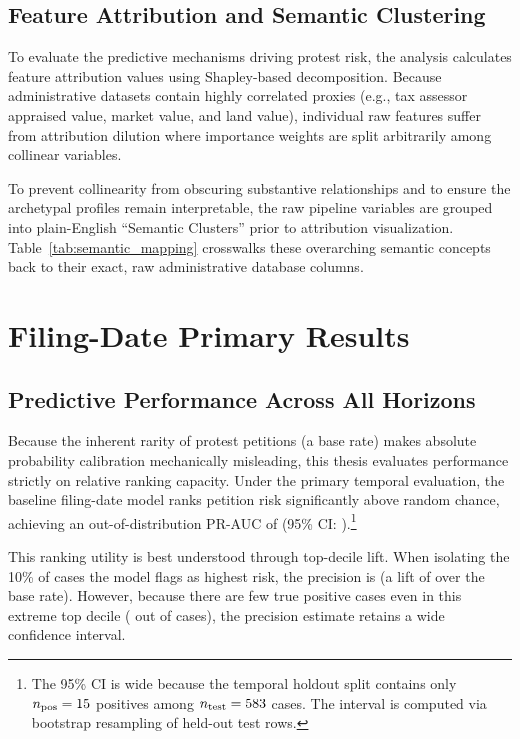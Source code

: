 \documentclass[11pt, letterpaper, oneside]{article}
\begin{document}
\subsection{Feature Attribution and Semantic Clustering}
\label{sec:feature_attribution}

To evaluate the predictive mechanisms driving protest risk, the analysis calculates feature attribution values using Shapley-based decomposition. Because administrative datasets contain highly correlated proxies (e.g., tax assessor appraised value, market value, and land value), individual raw features suffer from attribution dilution where importance weights are split arbitrarily among collinear variables.

To prevent collinearity from obscuring substantive relationships and to ensure the archetypal profiles remain interpretable, the raw pipeline variables are grouped into plain-English ``Semantic Clusters'' prior to attribution visualization. Table~\ref{tab:semantic_mapping} crosswalks these overarching semantic concepts back to their exact, raw administrative database columns.



\section{Filing-Date Primary Results}
\label{sec:results}

\subsection{Predictive Performance Across All Horizons}

Because the inherent rarity of protest petitions (a \metricBaseRate{} base rate) makes absolute probability calibration mechanically misleading, this thesis evaluates performance strictly on relative ranking capacity. Under the primary temporal evaluation, the baseline filing-date model ranks petition risk significantly above random chance, achieving an out-of-distribution PR-AUC of \metricBootstrapFiling{} (95\% CI: \metricBootstrapFilingCI{}).\footnote{The 95\% CI is wide because the temporal holdout split contains only $n_{\text{pos}} = 15{}$ positives among $n_{\text{test}}=583{}$ cases. The interval is computed via bootstrap resampling of held-out test rows.}

This ranking utility is best understood through top-decile lift. When isolating the 10\% of cases the model flags as highest risk, the precision is \metricTopDecilePrecision{} (a lift of \metricTopDecileLift{} over the base rate). However, because there are few true positive cases even in this extreme top decile (\metricTopDecileTP{} out of \metricTopDecileN{} cases), the precision estimate retains a wide confidence interval.
\end{document}
